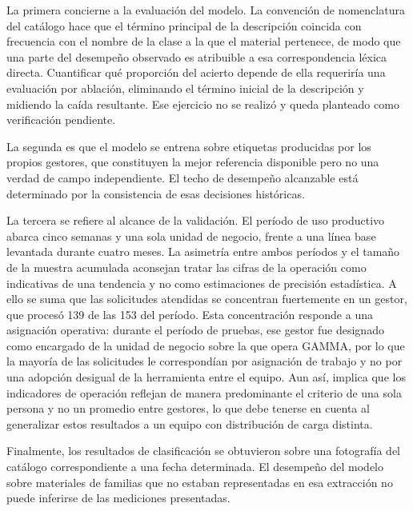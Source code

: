 La primera concierne a la evaluación del modelo. La convención de nomenclatura del catálogo hace que el término principal de la descripción coincida con frecuencia con el nombre de la clase a la que el material pertenece, de modo que una parte del desempeño observado es atribuible a esa correspondencia léxica directa. Cuantificar qué proporción del acierto depende de ella requeriría una evaluación por ablación, eliminando el término inicial de la descripción y midiendo la caída resultante. Ese ejercicio no se realizó y queda planteado como verificación pendiente.

La segunda es que el modelo se entrena sobre etiquetas producidas por los propios gestores, que constituyen la mejor referencia disponible pero no una verdad de campo independiente. El techo de desempeño alcanzable está determinado por la consistencia de esas decisiones históricas.

La tercera se refiere al alcance de la validación. El período de uso productivo abarca cinco semanas y una sola unidad de negocio, frente a una línea base levantada durante cuatro meses. La asimetría entre ambos períodos y el tamaño de la muestra acumulada aconsejan tratar las cifras de la operación como indicativas de una tendencia y no como estimaciones de precisión estadística. A ello se suma que las solicitudes atendidas se concentran fuertemente en un gestor, que procesó 139 de las 153 del período. Esta concentración responde a una asignación operativa: durante el período de pruebas, ese gestor fue designado como encargado de la unidad de negocio sobre la que opera GAMMA, por lo que la mayoría de las solicitudes le correspondían por asignación de trabajo y no por una adopción desigual de la herramienta entre el equipo. Aun así, implica que los indicadores de operación reflejan de manera predominante el criterio de una sola persona y no un promedio entre gestores, lo que debe tenerse en cuenta al generalizar estos resultados a un equipo con distribución de carga distinta.

Finalmente, los resultados de clasificación se obtuvieron sobre una fotografía del catálogo correspondiente a una fecha determinada. El desempeño del modelo sobre materiales de familias que no estaban representadas en esa extracción no puede inferirse de las mediciones presentadas.
